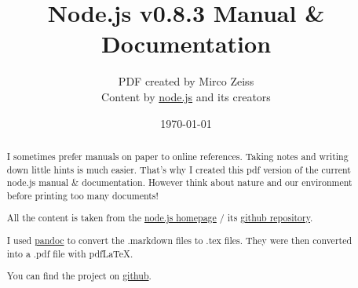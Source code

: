\documentclass[10pt, a4paper, titlepage, oneside, plain]{article}
\begin{document}
	\title{Node.js v0.8.3 Manual \& Documentation}
	\author{PDF created by Mirco Zeiss\\Content by \href{http://www.nodejs.org}{node.js} and its creators}
	\date{\today}

	\maketitle

	\begin{abstract}
	I sometimes prefer manuals on paper to online references. Taking notes and writing down little hints is much easier. That's why I created this pdf version of the current node.js manual \& documentation. However think about nature and our environment before printing too many documents!

	All the content is taken from the \href{http://www.nodejs.org}{node.js homepage} / its \href{https://github.com/joyent/node}{github repository}.

	I used \href{http://johnmacfarlane.net/pandoc/}{pandoc} to convert the .markdown files to .tex files. They were then converted into a .pdf file with pdfLaTeX.

	You can find the project on \href{https://github.com/zeMirco/nodejs-pdf-docs}{github}.
	\end{abstract}

	\tableofcontents

	
	
	
	
	
	
	
	
	
	
	
	
	
	
				
	
					
	
	
	
	
	
	
	
	
	
	\appendix
		
\end{document}
